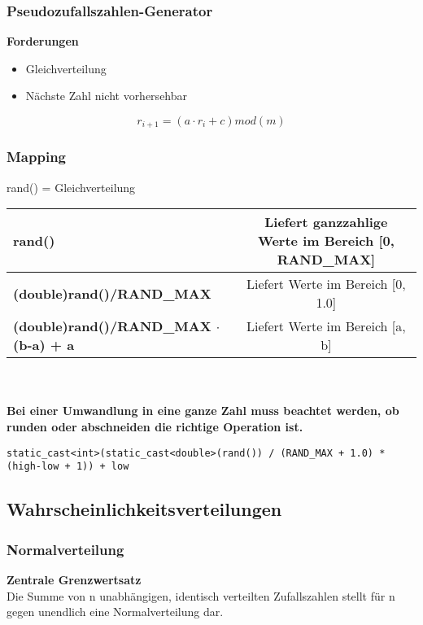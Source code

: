 \subsubsection{Pseudozufallszahlen-Generator}

\textbf{Forderungen}
\begin{itemize}
	\item Gleichverteilung
	\item Nächste Zahl nicht vorhersehbar
\end{itemize}
\begin{equation}
	r_{i+1} = (a \cdot r_i + c)mod (m)
\end{equation}

\subsubsection{Mapping}
rand() = Gleichverteilung\\

\begin{tabular}{|l|c|}
	\hline
	\textbf{rand()}                              & Liefert ganzzahlige Werte im Bereich [0, RAND\_MAX] \\ \hline
	\textbf{(double)rand()/RAND\_MAX}            &         Liefert Werte im Bereich [0, 1.0]          \\ \hline
	\textbf{(double)rand()/RAND\_MAX $\cdot$(b-a) + a} &          Liefert Werte im Bereich [a, b]           \\ \hline
\end{tabular} \\\\

\textbf{Bei einer Umwandlung in eine ganze Zahl muss beachtet werden, ob runden oder abschneiden die richtige Operation ist.}\\

\begin{lstlisting}
static_cast<int>(static_cast<double>(rand()) / (RAND_MAX + 1.0) * (high-low + 1)) + low
\end{lstlisting}


\subsection{Wahrscheinlichkeitsverteilungen}

\subsubsection{Normalverteilung}
\textbf{Zentrale Grenzwertsatz}\\
Die Summe von n unabhängigen, identisch verteilten Zufallszahlen stellt für n gegen unendlich eine Normalverteilung dar.

